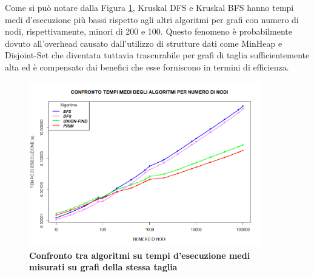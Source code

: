 \documentclass[]{article}
\begin{document}
\begin{flushleft}
Come si può notare dalla Figura \ref{conf_tot}, Kruskal DFS e Kruskal BFS hanno tempi medi d'esecuzione più bassi rispetto agli altri algoritmi per grafi con numero di nodi, rispettivamente, minori di 200 e 100. Questo fenomeno è probabilmente dovuto all'overhead causato dall'utilizzo di strutture dati come MinHeap e Disjoint-Set che diventata tuttavia trascurabile per grafi di taglia sufficientemente alta ed è compensato dai benefici che esse forniscono in termini di efficienza.
\begin{figure}[h]
	\centering
	\includegraphics[width=0.9\textwidth,height=\textheight,keepaspectratio]{CONFRONTO_TOTALE.png}
	\caption{\textbf{Confronto tra algoritmi su tempi d'esecuzione medi misurati su grafi della stessa taglia}}
	\label{conf_tot}
\end{figure}









\end{flushleft}
\end{document}
